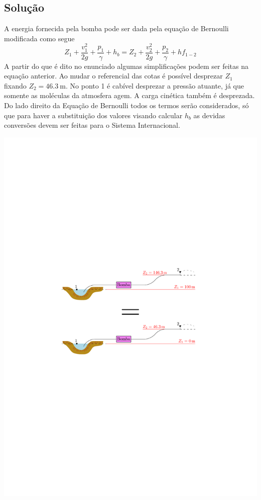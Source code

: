 \documentclass[a4paper, 12pt, brazilian]{article}
\begin{document}
	\subsection{Solução}
	A energia fornecida pela bomba pode ser dada pela equação de Bernoulli modificada como segue
	\begin{equation}
		\label{eq:bernoulli}
		Z_{1}+\dfrac{v_{1}^{2}}{2g}+\dfrac{p_{1}}{\gamma}+h_{b}=Z_{2}+\dfrac{v_{2}^{2}}{2g}+\dfrac{p_{2}}{\gamma}+hf_{1-2}
	\end{equation}
	A partir do que é dito no enunciado algumas simplificações podem ser feitas na equação anterior. Ao mudar o referencial das cotas é possível desprezar $Z_{1}$ fixando $Z_{2}=\SI{46.3}{\meter}$. No ponto 1 é cabível desprezar a pressão atuante, já que somente as moléculas da atmosfera agem. A carga cinética também é desprezada. Do lado direito da Equação de Bernoulli todos os termos serão considerados, só que para haver a substituição dos valores visando calcular $h_{b}$ as devidas conversões devem ser feitas para o Sistema Internacional.
	\begin{center}
		\includegraphics[width=.9\linewidth]{assets/images/referencia_1}
	\end{center}
\end{document}
